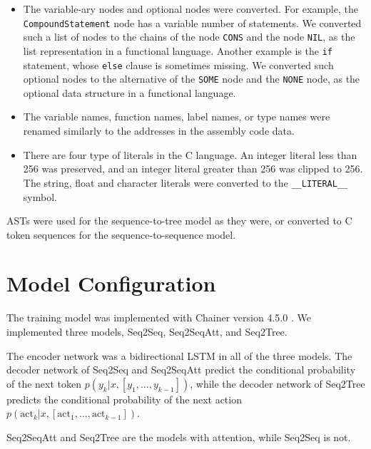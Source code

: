 \documentclass[11pt]{jarticle}
\begin{document}
\begin{itemize}
\item The variable-ary nodes and optional nodes were converted. 
For example, the \texttt{CompoundStatement} node has a variable number of statements. 
We converted such a list of nodes to the chains of the node \texttt{CONS} and the node \texttt{NIL}, as the list representation in a functional language.
Another example is the \texttt{if} statement, whose \texttt{else} clause is sometimes missing. 
We converted such optional nodes to the alternative of the \texttt{SOME} node and the \texttt{NONE} node, as the optional data structure in a functional language.
\item The variable names, function names, label names, or type names were renamed similarly to the addresses in the assembly code data.
\item There are four type of literals in the C language. 
An integer literal less than 256 was preserved, and an integer literal greater than 256 was clipped to 256.
The string, float and character literals were converted to the \texttt{\_\_LITERAL\_\_} symbol.

\end{itemize}

ASTs were used for the sequence-to-tree model as they were, or converted to C token sequences for the sequence-to-sequence model. 

\section{Model Configuration}
The training model was implemented with Chainer version 4.5.0 \citep{chainer}.
We implemented three models, Seq2Seq, Seq2SeqAtt, and Seq2Tree.

The encoder network was a bidirectional LSTM in all of the three models.
The decoder network of Seq2Seq and Seq2SeqAtt predict the conditional probability of the next token $ p(y_k|x,[y_1,\dots,y_{k-1}]) $,
while the decoder network of Seq2Tree predicts the conditional probability of the next action $ p(\mathrm{act}_{k}|x,[\mathrm{act}_1, \dots, \mathrm{act}_{k-1}]) $.

Seq2SeqAtt and Seq2Tree are the models with attention, while Seq2Seq is not.
\end{document}
